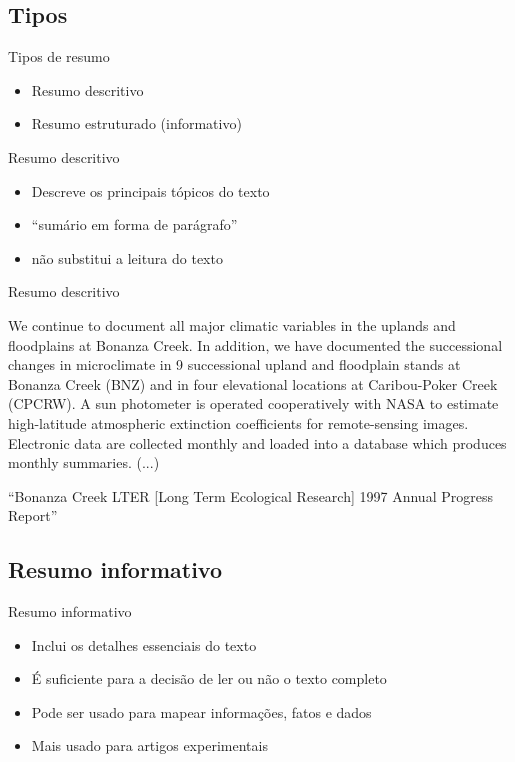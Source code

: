 \documentclass{beamer}
\begin{document}
\subsection{Tipos}

\begin{frame}{Tipos de resumo}
  \begin{itemize}
  \item Resumo descritivo
  \item Resumo estruturado (informativo)
  \end{itemize}
\end{frame}

\begin{frame}{Resumo descritivo}
  \begin{itemize}
  \item Descreve os principais tópicos do texto
  \item ``sumário em forma de parágrafo''
  \item não substitui a leitura do texto
  \end{itemize}
\end{frame}

\begin{frame}{Resumo descritivo}
  \begin{example}
    We continue to document all major climatic variables in the
    uplands and floodplains at Bonanza Creek. In addition, we have
    documented the successional changes in microclimate in 9
    successional upland and floodplain stands at Bonanza Creek (BNZ)
    and in four elevational locations at Caribou-Poker Creek
    (CPCRW). A sun photometer is operated cooperatively with NASA to
    estimate high-latitude atmospheric extinction coefficients for
    remote-sensing images. Electronic data are collected monthly and
    loaded into a database which produces monthly summaries.  (...)
  \end{example}
  ``Bonanza Creek LTER [Long Term Ecological Research] 1997 Annual
  Progress Report''

\end{frame}

\subsection{Resumo informativo}

\begin{frame}{Resumo informativo}
  \begin{itemize}
  \item Inclui os detalhes essenciais do texto
  \item É suficiente para a decisão de ler ou não o texto completo
  \item Pode ser usado para mapear informações, fatos e dados
  \item Mais usado para artigos experimentais
  \end{itemize}
\end{frame}
\end{document}
